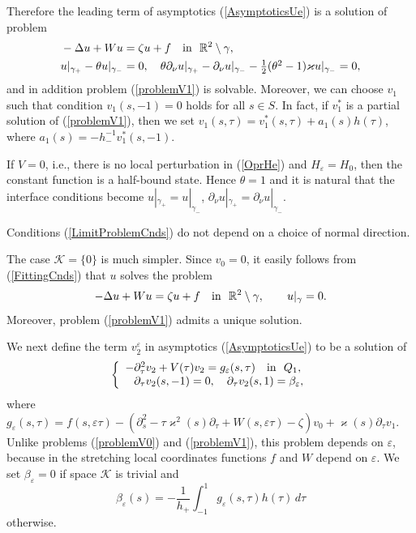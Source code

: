 \documentclass[graybox]{svmult}
\renewcommand{\kappa}{\varkappa}
\newcommand{\Real}{\mathbb R}
\newcommand{\eps}{\varepsilon}
\newcommand{\eqref}[1]{(\ref{#1})}
\newcommand{\pte}{\partial_\tau}
\newcommand{\pts}{\partial_s}
\begin{document}
Therefore the leading term of asymptotics \eqref{AsymptoticsUe} is a solution of problem
\begin{eqnarray}\label{LimitProblemEq}
&-\Delta u+Wu=\zeta u+f \quad \hbox{in \ } \Real^2\setminus \gamma,\\\label{LimitProblemCnds}
 &u|_{\gamma_+}-\theta u|_{\gamma_-}=0,\quad  \theta\partial_\nu u|_{\gamma_+}-\partial_\nu u|_{\gamma_-}
-\textstyle\frac{1}{2 }(\theta^2-1) \kappa u|_{\gamma_-}=0,
\end{eqnarray}
and in addition problem \eqref{problemV1} is solvable. Moreover, we can choose $v_1$ such that condition $v_1(s,-1)=0$ holds for all $s\in S$.
In fact, if $v_1^*$ is a partial solution of \eqref{problemV1}, then we set $v_1(s,\tau)=v_1^*(s,\tau)+a_1(s)h(\tau)$,
where $a_1(s)=-h_-^{-1}v_1^*(s,-1)$.

\begin{remark}
  If $V=0$, i.e., there is no local perturbation in \eqref{OprHe} and $H_\eps=H_0$, then the constant function is a half-bound state. Hence $\theta=1$ and it is natural that the interface conditions become
$u|_{\gamma_+}= u|_{\gamma_-}$, $\partial_\nu u|_{\gamma_+}=\partial_\nu u|_{\gamma_-}$.
\end{remark}
\begin{remark}
  Conditions \eqref{LimitProblemCnds} do not depend on a choice of normal direction.
\end{remark}


The case $\mathcal{K}=\{0\}$ is much simpler.  Since $v_0=0$, it easily follows from \eqref{FittingCnds} that $u$ solves the problem
\begin{equation}
-\Delta u+Wu=\zeta u+f \quad \hbox{in \ } \Real^2\setminus \gamma,\qquad
 u|_{\gamma}=0.
\end{equation}
Moreover, problem \eqref{problemV1} admits a unique solution.



We next define the term $v_2^\eps$ in asymptotics \eqref{AsymptoticsUe} to be a solution of
\begin{equation}\label{problemV2}
  \left\{
  \begin{array}{ll}
    -\pte^2 v_2+V(\tau)v_2=g_\eps(s,\tau)
\quad \hbox{in \ } Q_1, \\
    \phantom{-}\partial_\tau v_2(s, -1)=0, \quad
\partial_\tau v_2(s, 1)=\beta_\eps,
  \end{array}
\right.
\end{equation}
where $g_\eps(s,\tau)=f(s, \eps\tau)-
(\pts^2 -\tau\kappa^2(s)\pte+W(s, \eps\tau)-\zeta)v_0 +\kappa(s)\pte v_1$.
Unlike problems \eqref{problemV0} and \eqref{problemV1}, this problem depends on $\eps$, because in the stretching local coordinates functions $f$ and $W$ depend on $\eps$.
We set $\beta_\eps=0$ if space $\mathcal{K}$ is trivial and
$$
 \beta_\eps(s)=-\frac{1}{h_+}\int_{-1}^1 g_\eps(s,\tau)h(\tau)\,d\tau
$$
otherwise.
\end{document}
